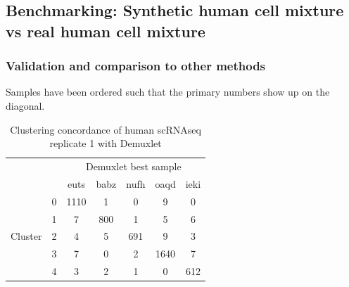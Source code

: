 \subsection{Benchmarking: Synthetic human cell mixture vs real human cell mixture}

\subsubsection{Validation and comparison to other methods}

Samples have been ordered such that the primary numbers show up on the diagonal.
\begin{table}[h!]
\begin{center}
\caption{Clustering concordance of human scRNAseq replicate 1 with Demuxlet}
\label{table:H1clust}
\begin{tabular}{ | c | c | c | c | c | c | c | } 
\hline
\multicolumn{2}{|c|}{} & \multicolumn{5}{c|}{Demuxlet best sample} \\
\cline{3-7}
\multicolumn{2}{|c|}{} & euts & babz & nufh & oaqd & ieki \\
\hline
\multirow{6}{4em}{Cluster} & 0 & 1110 & 1 & 0 & 9 & 0 \\
					 \cline{2-7}
                                           & 1 & 7 &  800 & 1 & 5  & 6  \\
                                           \cline{2-7}
                                           & 2 & 4 & 5 & 691 & 9 & 3 \\
                                           \cline{2-7}
                                           & 3 & 7 & 0 & 2 & 1640 & 7 \\
                                           \cline{2-7}
                                           & 4 & 3 & 2 & 1 & 0 & 612 \\
                                           \hline
\end{tabular}
\end{center}
\end{table}

